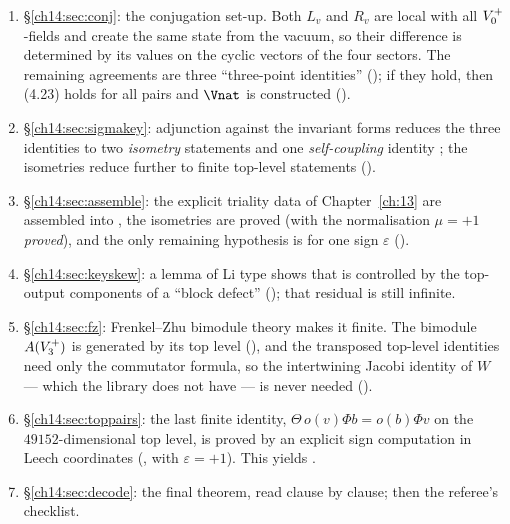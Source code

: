 \begin{enumerate}[label=(\arabic*)]
\item \S\ref{ch14:sec:conj}: the conjugation set-up.  Both $L_v$ and $R_v$ are local with all
  $V_0^{+}$-fields and create the same state from the vacuum, so their difference is determined by
  its values on the cyclic vectors of the four sectors.  The remaining agreements are three
  ``three-point identities'' (); if they hold, then (4.23) holds for all pairs and
  $\Vnat$ is constructed ().
\item \S\ref{ch14:sec:sigmakey}: adjunction against the invariant forms reduces the three
  identities to two \emph{isometry} statements and one \emph{self-coupling} identity
  ; the isometries reduce further to finite top-level statements
  ().
\item \S\ref{ch14:sec:assemble}: the explicit triality data of Chapter~\ref{ch:13} are assembled into
  , the isometries are proved (with the normalisation $\mu=+1$ \emph{proved}), and
  the only remaining hypothesis is  for one sign $\varepsilon$
  ().
\item \S\ref{ch14:sec:keyskew}: a lemma of Li type shows that  is controlled by the
  top-output components of a ``block defect'' (); that residual is still
  infinite.
\item \S\ref{ch14:sec:fz}: Frenkel--Zhu bimodule theory makes it finite.  The bimodule
  $A(V_3^{+})$ is generated by its top level (), and the transposed top-level
  identities need only the commutator formula, so the intertwining Jacobi identity of $W$ — which
  the library does not have — is never needed ().
\item \S\ref{ch14:sec:toppairs}: the last finite identity, $\Theta\,o(v)\Phi b=o(b)\Phi v$ on the
  $49152$-dimensional top level, is proved by an explicit sign computation in Leech coordinates
  (, with $\varepsilon=+1$).  This yields .
\item \S\ref{ch14:sec:decode}: the final theorem, read clause by clause; then the referee's
  checklist.
\end{enumerate}

